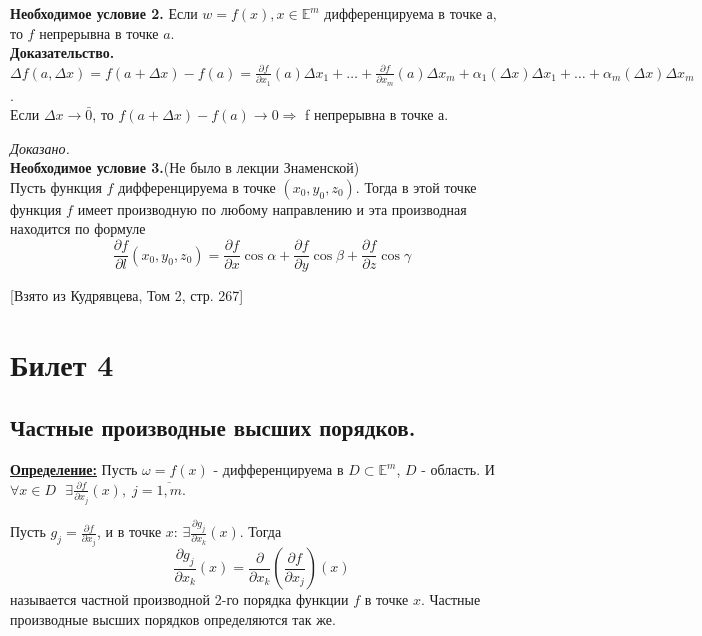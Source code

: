 \documentclass[a4paper,12pt]{article} %
\begin{document}
	\textbf{Необходимое условие 2.} Если $w = f(x), x \in \mathds{E}^m$ дифференцируема в точке а, то $f$ непрерывна в точке $a$.\\
	
	\textbf{Доказательство.}\\
	$\Delta f(a, \Delta x) = f(a + \Delta x) - f(a) = \frac{\partial f}{\partial x_1}(a) \Delta x_1 + \ldots + \frac{\partial f}{\partial x_m}(a) \Delta x_m + \alpha_1(\Delta x) \Delta x_1 + \ldots + \alpha_m (\Delta x)\Delta x_m$.\\
	Если $\Delta x \to \bar0$, то $f(a + \Delta x) - f(a) \to 0 \Rightarrow $ f непрерывна в точке а.
	
	\textit{Доказано.}\\
	
	\textbf{Необходимое условие 3.}(Не было в лекции Знаменской)\\
	Пусть функция $f$ 	дифференцируема в  точке $(x_0, y_0, z_0)$. Тогда в этой точке функция $f$ имеет производную по любому направлению и эта производная находится по формуле 
	\[\frac{\partial f}{\partial l}(x_0, y_0, z_0) = \frac{\partial f}{\partial x}\cos \alpha + \frac{\partial f}{\partial y}\cos\beta + \frac{\partial f}{\partial z}\cos \gamma\]
	\begin{center}
		[Взято из Кудрявцева, Том 2, стр. 267]
	\end{center}
	
	
	\newpage
	\section{Билет 4}
	
	\subsection{Частные производные высших порядков.}
	
	\underline{\textbf{Определение:}} Пусть $\omega = f(x)$ - дифференцируема в $D \subset \mathbb{E}^m$, $D$ - область.
	И $\forall x \in D \text{ }\exists \frac{\partial{f}}{\partial{x_j}}(x), \; j = \overline{1, m}$.
	
	Пусть $g_j = \frac{\partial{f}}{\partial{x_j}}$, и в точке $x$:  $\exists\frac{\partial{g_j}}{\partial{x_k}}(x)$. Тогда
	\[
	\frac{\partial{g_j}}{\partial{x_k}}(x) = \frac{\partial{ }}{\partial{x_k}}\left(\frac{\partial{f}}{\partial{x_j}}\right)(x)
	\]
	называется частной производной 2-го порядка функции $f$ в точке $x$. Частные производные высших порядков определяются так же.\\
	
\end{document}
